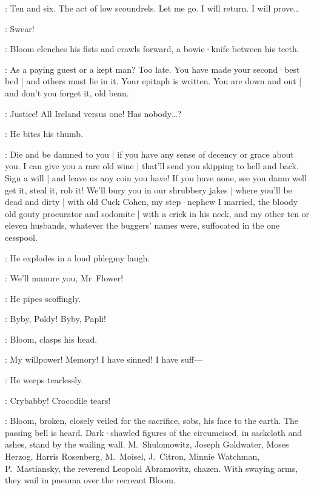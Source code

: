 \Bloom:
Ten and six.
The act of low scoundrels.
Let me go.
I will return.
I will prove…

\Voice:
Swear!

:
Bloom clenches his fists and crawls forward,
a bowie·knife between his teeth.

\Bello:
As a paying guest or a kept man?
Too late.
You have made your second·best bed |
and others must lie in it.
Your epitaph is written.
You are down and out |
and don't you forget it,
old bean.%

\Bloom:
Justice!
All Ireland versus one!
Has nobody…?

:
He bites his thumb.

\Bello:
Die and be damned to you |
if you have any sense of decency or grace about you.
I can give you a rare old wine |
that'll send you skipping to hell and back.
Sign a will |
and leave us any coin you have!
If you have none,
see you damn well get it,
steal it,
rob it!
We'll bury you in our shrubbery jakes |
where you'll be dead and dirty  |
with old Cuck Cohen,
my step·nephew I married,
the bloody old gouty procurator and sodomite |
with a crick in his neck,
and my other ten or eleven husbands,
%
whatever the buggers' names were,
suffocated in the one cesspool.

:
He explodes in a loud phlegmy laugh.

\Bello:
We'll manure you,
Mr~Flower!

:
He pipes scoffingly.

\Bello:
Byby,
Poldy!
Byby,
Papli!

:
Bloom,
clasps his head.

\Bloom:
My willpower!
Memory!
I have sinned!
I have suff---

:
He weeps tearlessly.

\Bello:
Crybabby!
Crocodile tears!


:
Bloom,
broken,
closely veiled for the sacrifice,
sobs,
his face to the earth.
%
The passing bell is heard.
Dark·shawled figures of the circumcised,
in sackcloth and ashes,
stand by the wailing wall.
M.~Shulomowitz,
Joseph Goldwater,
Moses Herzog,
Harris Rosenberg,
M.~Moisel,
J.~Citron,
Minnie Watchman,
P.~Mastiansky,
the reverend Leopold Abramovitz,
chazen.
With swaying arms,
they wail in pneuma over the recreant Bloom.

